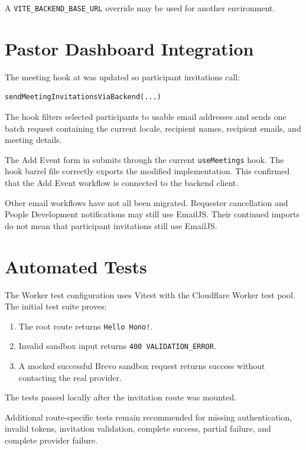 \documentclass[11pt,a4paper,oneside]{report}
\begin{document}
A \texttt{VITE\_BACKEND\_BASE\_URL} override may be used for another environment.

\section{Pastor Dashboard Integration}

The meeting hook at  was updated so participant invitations call:

\begin{lstlisting}
sendMeetingInvitationsViaBackend(...)
\end{lstlisting}

The hook filters selected participants to usable email addresses and sends one batch request containing the current locale, recipient names, recipient emails, and meeting details.

The Add Event form in  submits through the current \texttt{useMeetings} hook. The hook barrel file correctly exports the modified implementation. This confirmed that the Add Event workflow is connected to the backend client.

Other email workflows have not all been migrated. Requester cancellation and People Development notifications may still use EmailJS. Their continued imports do not mean that participant invitations still use EmailJS.

\section{Automated Tests}

The Worker test configuration uses Vitest with the Cloudflare Worker test pool. The initial test suite proves:

\begin{enumerate}
  \item The root route returns \texttt{Hello Hono!}.
  \item Invalid sandbox input returns \texttt{400 VALIDATION\_ERROR}.
  \item A mocked successful Brevo sandbox request returns success without contacting the real provider.
\end{enumerate}

The tests passed locally after the invitation route was mounted.

Additional route-specific tests remain recommended for missing authentication, invalid tokens, invitation validation, complete success, partial failure, and complete provider failure.
\end{document}
